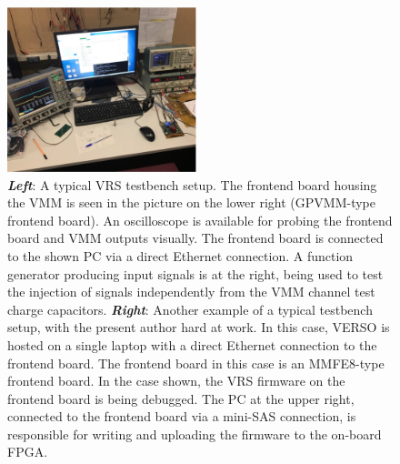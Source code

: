 \begin{figure}[!htb]
    \begin{center}
        \includegraphics[width=0.49\textwidth]{figures/nsw/use_cases/verso_use_case_vs_socket}
        \caption{
            \textbf{\textit{Left}}: A typical VRS testbench setup.
                The frontend board housing the VMM is seen in the picture on the lower right (GPVMM-type frontend board).
                An oscilloscope is available for probing the frontend board and VMM outputs visually.
                The frontend board is connected to the shown PC via a direct Ethernet connection.
                A function generator producing input signals is at the right, being used to test the injection
                of signals independently from the VMM channel test charge capacitors.
            \textbf{\textit{Right}}: Another example of a typical testbench setup, with the present
                author hard at work.
                In this case, VERSO is hosted on a single laptop with a direct Ethernet connection to the frontend board.
                The frontend board in this case is an MMFE8-type frontend board.
                In the case shown, the VRS firmware on the frontend board is being debugged.
                The PC at the upper right, connected to the frontend board via a mini-SAS connection, is responsible for writing and uploading the firmware to the
                on-board FPGA.
        }
        \label{fig:vrs_testbench}
    \end{center}
\end{figure}


